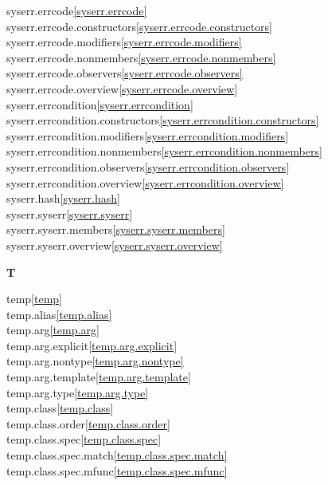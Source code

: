 \begin{multicols}{2}
syserr.errcode\quad\ref{syserr.errcode}\\
syserr.errcode.constructors\quad\ref{syserr.errcode.constructors}\\
syserr.errcode.modifiers\quad\ref{syserr.errcode.modifiers}\\
syserr.errcode.nonmembers\quad\ref{syserr.errcode.nonmembers}\\
syserr.errcode.observers\quad\ref{syserr.errcode.observers}\\
syserr.errcode.overview\quad\ref{syserr.errcode.overview}\\
syserr.errcondition\quad\ref{syserr.errcondition}\\
syserr.errcondition.constructors\quad\ref{syserr.errcondition.constructors}\\
syserr.errcondition.modifiers\quad\ref{syserr.errcondition.modifiers}\\
syserr.errcondition.nonmembers\quad\ref{syserr.errcondition.nonmembers}\\
syserr.errcondition.observers\quad\ref{syserr.errcondition.observers}\\
syserr.errcondition.overview\quad\ref{syserr.errcondition.overview}\\
syserr.hash\quad\ref{syserr.hash}\\
syserr.syserr\quad\ref{syserr.syserr}\\
syserr.syserr.members\quad\ref{syserr.syserr.members}\\
syserr.syserr.overview\quad\ref{syserr.syserr.overview}\\
\par \textbf{T}\par
temp\quad\ref{temp}\\
temp.alias\quad\ref{temp.alias}\\
temp.arg\quad\ref{temp.arg}\\
temp.arg.explicit\quad\ref{temp.arg.explicit}\\
temp.arg.nontype\quad\ref{temp.arg.nontype}\\
temp.arg.template\quad\ref{temp.arg.template}\\
temp.arg.type\quad\ref{temp.arg.type}\\
temp.class\quad\ref{temp.class}\\
temp.class.order\quad\ref{temp.class.order}\\
temp.class.spec\quad\ref{temp.class.spec}\\
temp.class.spec.match\quad\ref{temp.class.spec.match}\\
temp.class.spec.mfunc\quad\ref{temp.class.spec.mfunc}\\

\end{multicols}
